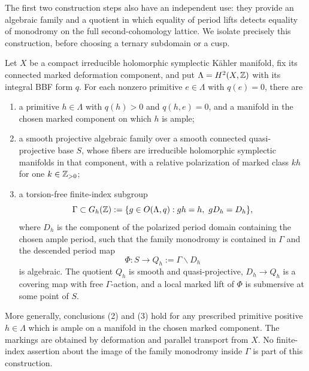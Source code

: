 The first two construction steps also have an independent use: they
provide an algebraic family and a quotient in which equality of period
lifts detects equality of monodromy on the full second-cohomology
lattice. We isolate precisely this construction, before choosing a
ternary subdomain or a cusp.

\begin{lemma}
\label{lem:polarized-family-construction}
Let $X$ be a compact irreducible holomorphic symplectic K\"ahler
manifold, fix its connected marked deformation component, and put
$\Lambda=H^2(X,\mathbb Z)$ with its integral BBF form $q$.
For each nonzero primitive $e\in\Lambda$ with $q(e)=0$, there are
\begin{enumerate}
\item a primitive $h\in\Lambda$ with $q(h)>0$ and $q(h,e)=0$,
and a manifold in the chosen marked component on which $h$ is ample;
\item a smooth projective algebraic family over a smooth connected
quasi-projective base $S$, whose fibers are irreducible holomorphic
symplectic manifolds in that component, with a relative polarization
of marked class $kh$ for one $k\in\mathbb Z_{>0}$;
\item a torsion-free finite-index subgroup
\[
 \Gamma\subset G_h(\mathbb Z)
 :=\{g\in O(\Lambda,q):gh=h,\ gD_h=D_h\},
\]
where $D_h$ is the component of the polarized period domain containing
the chosen ample period, such that the family monodromy is contained
in $\Gamma$ and the descended period map
\[
       \Phi:S\longrightarrow Q_h:=\Gamma\backslash D_h
\]
is algebraic. The quotient $Q_h$ is smooth and quasi-projective,
$D_h\to Q_h$ is a covering map with free $\Gamma$-action, and a local
marked lift of $\Phi$ is submersive at some point of $S$.
\end{enumerate}
More generally, conclusions \textup{(2)} and \textup{(3)} hold for any
prescribed primitive positive $h\in\Lambda$ which is ample on a
manifold in the chosen marked component.
The markings are obtained by deformation and parallel transport from
$X$. No finite-index assertion about the image of the family monodromy
inside $\Gamma$ is part of this construction.
\end{lemma}

